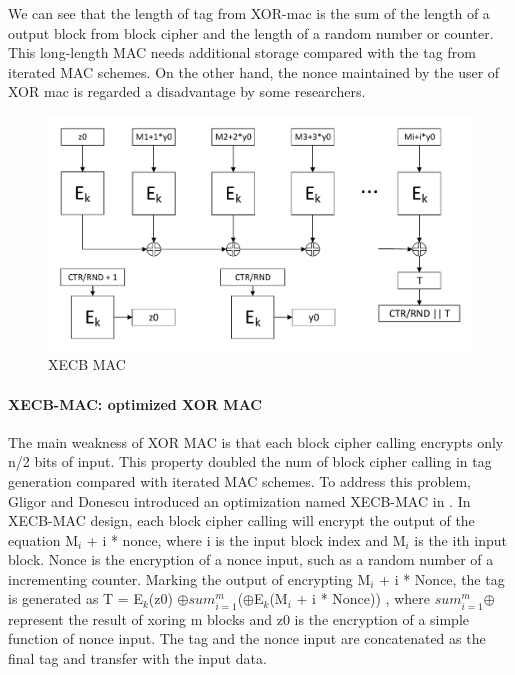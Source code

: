 \documentclass{article}
\begin{document}
We can see that the length of tag from XOR-mac is the sum of the length of a output block from block cipher and the length of a random number or counter. This long-length MAC needs additional storage compared with the tag from iterated MAC schemes. 
On the other hand, the nonce maintained by the user of XOR mac is regarded a disadvantage by some researchers.

\begin{figure}[htbp]
\centering
\includegraphics[scale=0.5]{./diagrams/xecb-mac.pdf}
\caption{XECB MAC}
\label{fig:XECB-MAC}
\end{figure}
\paragraph{XECB-MAC: optimized XOR MAC}
The main weakness of XOR MAC is that each block cipher calling encrypts only n/2 bits of input. This property doubled the num of block cipher calling in tag generation compared with iterated MAC schemes. To address this problem, Gligor and Donescu introduced an optimization named XECB-MAC in \cite{gligor2002fast}. In XECB-MAC design, each block cipher calling will encrypt the output of the equation M$_i$ + i * nonce, where i is the input block index and M$_i$ is the ith input block. Nonce is the encryption of a nonce input, such as a random number of a incrementing counter. Marking the output of encrypting M$_i$ + i * Nonce, the tag is generated as T = E$_k$(z0) $\oplus$$sum_{i=1}^{m}$($\oplus$E$_k$(M$_i$ + i * Nonce)) , where $sum_{i=1}^{m}$$\oplus$ represent the result of xoring m blocks and z0 is the encryption of a simple function of nonce input. The tag and the nonce input are concatenated as the final tag and transfer with the input data. 
\end{document}
